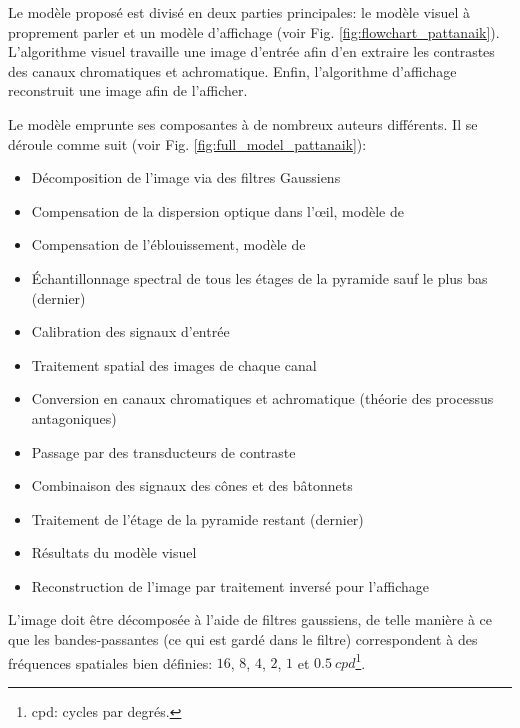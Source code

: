 	\par Le modèle proposé est divisé en deux parties principales: le modèle visuel à proprement parler et un modèle d'affichage (voir Fig. \ref{fig:flowchart_pattanaik}). L'algorithme visuel travaille une image d'entrée afin d'en extraire les contrastes des canaux chromatiques et achromatique. Enfin, l'algorithme d'affichage reconstruit une image afin de l'afficher.
	
	\par Le modèle emprunte ses composantes à de nombreux auteurs différents. Il se déroule comme suit (voir Fig. \ref{fig:full_model_pattanaik}):
	\begin{itemize}
		\item Décomposition de l'image via des filtres Gaussiens
		\item Compensation de la dispersion optique dans l'œil, modèle de \citep{westheimer_eye_1986}
		\item Compensation de l'éblouissement, modèle de \citep{spencer_physically-based_1995}
		\item Échantillonnage spectral de tous les étages de la pyramide sauf le plus bas (dernier) \citep{fairchild_color_1998,wyszecki_color_2000}
		\item Calibration des signaux d'entrée
		\item Traitement spatial des images de chaque canal \citep{burt_laplacian_1983, peli_contrast_1990}
		\item Conversion en canaux chromatiques et achromatique (théorie des processus antagoniques) \citep{hunt_reproduction_1995,fairchild_color_1998}
		\item Passage par des transducteurs de contraste \citep{watson_model_1997}
		\item Combinaison des signaux des cônes et des bâtonnets
		\item Traitement de l'étage de la pyramide restant (dernier) \citep{fairchild_color_1998}
		\item Résultats du modèle visuel
		\item Reconstruction de l'image par traitement inversé pour l'affichage
	\end{itemize}
	
	\par L'image doit être décomposée à l'aide de filtres gaussiens, de telle manière à ce que les bandes-passantes (ce qui est gardé dans le filtre) correspondent à des fréquences spatiales bien définies: $16$, $8$, $4$, $2$, $1$ et $0.5~cpd$\footnote{cpd: cycles par degrés.}.
	
